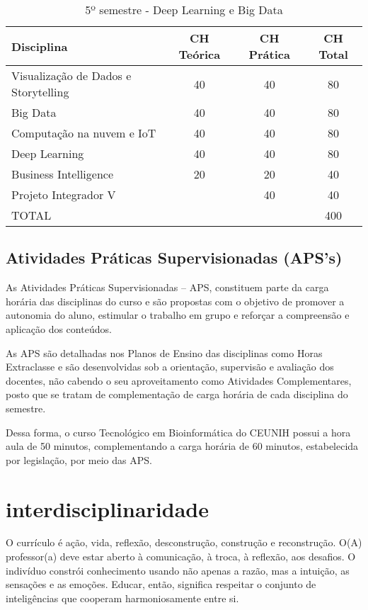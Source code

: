 \documentclass[a4paper, 12pt, openright, oneside, german, french, english, brazil]{abntex2}
\begin{document}
\begin{table}[!h]
  \centering
  \footnotesize
  \caption{5º semestre - Deep Learning e Big Data}
  \label{5sem}
  \begin{tabular}{|p{6cm}|c|c|c|}
    \hline
    \textbf{Disciplina} & CH Teórica & CH Prática & CH Total \\
    \hline
    Visualização de Dados e Storytelling & 40 & 40 & 80 \\
    \hline
    Big Data & 40 & 40 & 80 \\
    \hline
    Computação na nuvem e IoT & 40 & 40 & 80 \\
    \hline
    Deep Learning & 40 & 40 & 80 \\
    \hline
    Business Intelligence & 20 & 20 & 40 \\
    \hline
    Projeto Integrador V & & 40 & 40 \\
    \hline
    TOTAL & & & 400 \\
    \hline
  \end{tabular}
\end{table}

\newpage

\section{Atividades Práticas Supervisionadas (APS's)}

As Atividades Práticas Supervisionadas – APS, constituem parte da carga horária das disciplinas do curso e são propostas com o objetivo de promover a autonomia do aluno, estimular o trabalho em grupo e reforçar a compreensão e aplicação dos conteúdos.

As APS são detalhadas nos Planos de Ensino das disciplinas como Horas Extraclasse e são desenvolvidas sob a orientação, supervisão e avaliação dos docentes, não cabendo o seu aproveitamento como Atividades Complementares, posto que se tratam de complementação de carga horária de cada disciplina do semestre.

Dessa forma, o curso Tecnológico em Bioinformática do CEUNIH possui a hora aula de 50 minutos, complementando a carga horária de 60 minutos, estabelecida por legislação, por meio das APS.

\chapter{interdisciplinaridade}

O currículo é ação, vida, reflexão, desconstrução, construção e reconstrução. O(A) professor(a) deve estar aberto à comunicação, à troca, à reflexão, aos desafios. O indivíduo constrói conhecimento usando não apenas a razão, mas a intuição, as sensações e as emoções. Educar, então, significa respeitar o conjunto de inteligências que cooperam harmoniosamente entre si.
\end{document}
